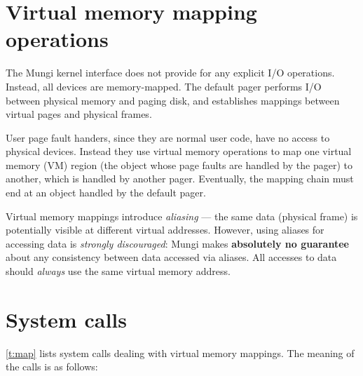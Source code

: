 \documentclass[a4paper,11pt,twoside,dvips]{report}
\begin{document}
\section{\label{s:map}Virtual memory mapping operations}

The Mungi kernel interface does not provide for any explicit I/O
operations. Instead, all devices are memory-mapped. The default pager
performs I/O between physical memory and paging disk, and establishes
mappings between virtual pages and physical frames.

User page fault handers, since they are normal user code, have no access
to physical devices. Instead they use virtual memory operations to map
one virtual memory (VM) region (the object whose page faults are handled
by the pager) to another, which is handled by another pager. Eventually,
the mapping chain must end at an object handled by the default pager.

Virtual memory mappings introduce \emph{aliasing} --- the same data
(physical frame) is potentially visible at different virtual
addresses. However, using aliases for accessing data is \emph{strongly
discouraged}: Mungi makes \textbf{absolutely no guarantee} about any
consistency between data accessed via aliases. All accesses to data
should \emph{always} use the same virtual memory address.

\section{\label{s:map-calls}System calls}

\autoref{t:map} lists system calls dealing with virtual memory
mappings. The meaning of the calls is as follows:
\end{document}
